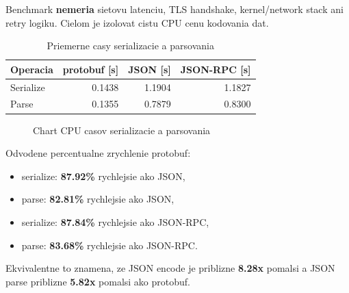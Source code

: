 \documentclass[12pt,a4paper]{report}
\begin{document}
Benchmark \textbf{nemeria} sietovu latenciu, TLS handshake, kernel/network stack
ani retry logiku. Cielom je izolovat cistu CPU cenu kodovania dat.

\begin{table}[htbp]
\centering
\caption{Priemerne casy serializacie a parsovania}
\label{tab:cpu-serialize-parse}
\begin{tabular}{|l|r|r|r|}
\hline
Operacia & protobuf [s] & JSON [s] & JSON-RPC [s] \\
\hline
Serialize & 0.1438 & 1.1904 & 1.1827 \\
Parse     & 0.1355 & 0.7879 & 0.8300 \\
\hline
\end{tabular}
\end{table}

\begin{figure}[htbp]
\centering
{}
\caption{Chart CPU casov serializacie a parsovania}
\label{fig:cpu-serialize-parse-chart}
\end{figure}

Odvodene percentualne zrychlenie protobuf:
\begin{itemize}
  \item serialize: \textbf{87.92\%} rychlejsie ako JSON,
  \item parse: \textbf{82.81\%} rychlejsie ako JSON,
  \item serialize: \textbf{87.84\%} rychlejsie ako JSON-RPC,
  \item parse: \textbf{83.68\%} rychlejsie ako JSON-RPC.
\end{itemize}

Ekvivalentne to znamena, ze JSON encode je priblizne \textbf{8.28x} pomalsi
a JSON parse priblizne \textbf{5.82x} pomalsi ako protobuf.
\end{document}
